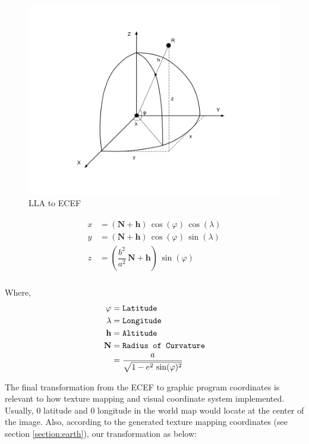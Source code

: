 \begin{figure}[H]
\caption{LLA to ECEF}
\label{fig:lla2ecef}
\centering
\includegraphics[width=\textwidth, keepaspectratio]{Figures/lla2ecef.png}
\decoRule
\end{figure}

\[
\begin{array}{lr}
\begin{aligned}
x &= (\mathbf{N} + \mathbf{h})\,\cos(\varphi)\,\cos(\lambda)\\
y &= (\mathbf{N} + \mathbf{h})\,\cos(\varphi)\,\sin(\lambda)\\
z &= (\dfrac{b^2}{a^2}\,\mathbf{N} + \mathbf{h})\,\sin(\varphi)\\
\end{aligned}
\end{array}
\]

Where,
\[
\begin{array}{lr}
\begin{aligned}
\varphi &= \texttt{Latitude}\\
\lambda &= \texttt{Longitude}\\
\mathbf{h} &= \texttt{Altitude}\\
\mathbf{N} &= \texttt{Radius of Curvature}\\
&= \dfrac{a}{\sqrt{1 - e^2\,\sin(\varphi)^2}}\\
\end{aligned}
\end{array}
\]

The final transformation from the ECEF to graphic program coordinates is relevant to how texture mapping and visual coordinate system implemented. Usually, $0$ latitude and $0$ longitude in the world map would locate at the center of the image. Also, according to the generated texture mapping coordinates (see section \ref{section:earth}), our transformation as below:

